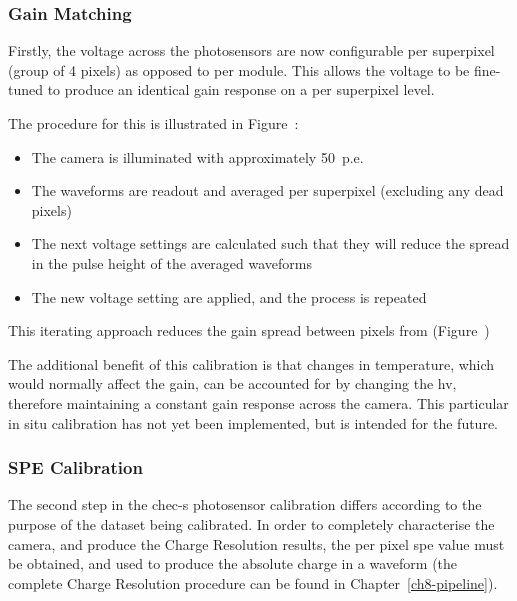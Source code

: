 \subsubsection{Gain Matching}

Firstly, the voltage across the photosensors are now configurable per superpixel (group of 4 pixels)  as opposed to per module. This allows the voltage to be fine-tuned to produce an identical gain response on a per superpixel level.

The procedure for this is illustrated in Figure~:
\begin{itemize}
	\item The camera is illuminated with approximately 50~p.e.
	\item The waveforms are readout and averaged per superpixel (excluding any dead pixels)
	\item The next voltage settings are calculated such that they will reduce the spread in the pulse height of the averaged waveforms
	\item The new voltage setting are applied, and the process is repeated
\end{itemize}
This iterating approach reduces the gain spread between pixels from  (Figure~)


The additional benefit of this calibration is that changes in temperature, which would normally affect the gain, can be accounted for by changing the \gls{hv}, therefore maintaining a constant gain response across the camera. This particular in situ calibration has not yet been implemented, but is intended for the future.


\subsubsection{SPE Calibration}

The second step in the \gls{chec-s} photosensor calibration differs according to the purpose of the dataset being calibrated. In order to completely characterise the camera, and produce the Charge Resolution results, the per pixel \gls{spe} value must be obtained, and used to produce the absolute charge in a waveform (the complete Charge Resolution procedure can be found in Chapter~\ref{ch8-pipeline}).

